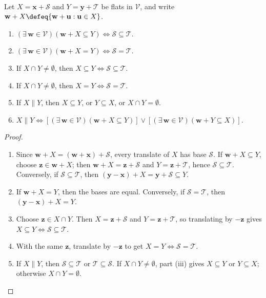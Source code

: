 \begin{proposition} \label{prop:basic-flat-incidence} \\
Let $X=\mathbf{x}+\mathcal{S}$ and $Y=\mathbf{y}+\mathcal{T}$ be flats in $\mathcal{V}$, and write $\mathbf{w}+X\defeq\{\mathbf{w}+\mathbf{u}:\mathbf{u}\in X\}$.
\begin{enumerate}[label=(\roman*)]
\setlength{\itemsep}{0pt}
\item $(\exists\,\mathbf{w}\in\mathcal{V})(\mathbf{w}+X\subseteq Y)\iff\mathcal{S}\subseteq\mathcal{T}$.
\item $(\exists\,\mathbf{w}\in\mathcal{V})(\mathbf{w}+X=Y)\iff\mathcal{S}=\mathcal{T}$.
\item If $X\cap Y\neq\emptyset$, then $X\subseteq Y\iff\mathcal{S}\subseteq\mathcal{T}$.
\item If $X\cap Y\neq\emptyset$, then $X=Y\iff\mathcal{S}=\mathcal{T}$.
\item If $X\parallel Y$, then $X\subseteq Y$, or $Y\subseteq X$, or $X\cap Y=\emptyset$.
\item $X\parallel Y\iff[(\exists\,\mathbf{w}\in\mathcal{V})(\mathbf{w}+X\subseteq Y)]\lor[(\exists\,\mathbf{w}\in\mathcal{V})(\mathbf{w}+Y\subseteq X)]$.
\end{enumerate}
\begin{proof}
\begin{enumerate}[label=(\roman*)]
\setlength{\itemsep}{0pt}
\item Since $\mathbf{w}+X=(\mathbf{w}+\mathbf{x})+\mathcal{S}$, every translate of $X$ has base $\mathcal{S}$. If $\mathbf{w}+X\subseteq Y$, choose $\mathbf{z}\in\mathbf{w}+X$; then $\mathbf{w}+X=\mathbf{z}+\mathcal{S}$ and $Y=\mathbf{z}+\mathcal{T}$, hence $\mathcal{S}\subseteq\mathcal{T}$. Conversely, if $\mathcal{S}\subseteq\mathcal{T}$, then $(\mathbf{y}-\mathbf{x})+X=\mathbf{y}+\mathcal{S}\subseteq Y$.
\item If $\mathbf{w}+X=Y$, then the bases are equal. Conversely, if $\mathcal{S}=\mathcal{T}$, then $(\mathbf{y}-\mathbf{x})+X=Y$.
\item Choose $\mathbf{z}\in X\cap Y$. Then $X=\mathbf{z}+\mathcal{S}$ and $Y=\mathbf{z}+\mathcal{T}$, so translating by $-\mathbf{z}$ gives $X\subseteq Y\iff\mathcal{S}\subseteq\mathcal{T}$.
\item With the same $\mathbf{z}$, translate by $-\mathbf{z}$ to get $X=Y\iff\mathcal{S}=\mathcal{T}$.
\item If $X\parallel Y$, then $\mathcal{S}\subseteq\mathcal{T}$ or $\mathcal{T}\subseteq\mathcal{S}$. If $X\cap Y\neq\emptyset$, part (iii) gives $X\subseteq Y$ or $Y\subseteq X$; otherwise $X\cap Y=\emptyset$.

\end{enumerate}
\end{proof}
\end{proposition}
